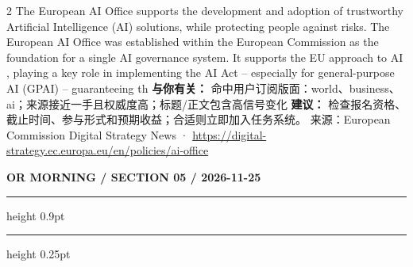 \documentclass[10.5pt]{ctexart}
\begin{document}
\begin{multicols}{2}
The European AI Office supports the development and adoption of trustworthy Artificial Intelligence (AI) solutions, while protecting people against risks. The European AI Office was established within the European Commission as the foundation for a single AI governance system. It supports the EU approach to AI , playing a key role in implementing the AI Act – especially for general-purpose AI (GPAI) – guaranteeing th
\textbf{与你有关：} 命中用户订阅版面：world、business、ai；来源接近一手且权威度高；标题/正文包含高信号变化
\textbf{建议：} 检查报名资格、截止时间、参与形式和预期收益；合适则立即加入任务系统。
{\footnotesize\color{ormuted} 来源：European Commission Digital Strategy News · \url{https://digital-strategy.ec.europa.eu/en/policies/ai-office}}
\end{multicols}
\newpage
{\small\bfseries OR MORNING / SECTION 05 / 2026-11-25}
\vspace{2mm}
\hrule height 0.9pt
\vspace{1.5mm}
\hrule height 0.25pt
\vspace{4mm}
\end{document}
